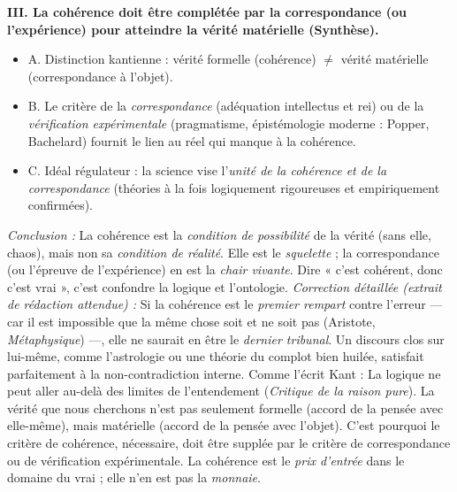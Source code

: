 \documentclass[11pt]{article}
\begin{document}
\begin{exoresolu}
\textbf{III. La cohérence doit être complétée par la correspondance (ou l'expérience) pour atteindre la vérité matérielle (Synthèse).}
\begin{itemize}
    \item A. Distinction kantienne : vérité formelle (cohérence) $\neq$ vérité matérielle (correspondance à l'objet).
    \item B. Le critère de la \emph{correspondance} (adéquation intellectus et rei) ou de la \emph{vérification expérimentale} (pragmatisme, épistémologie moderne : Popper, Bachelard) fournit le lien au réel qui manque à la cohérence.
    \item C. Idéal régulateur : la science vise l'\emph{unité de la cohérence et de la correspondance} (théories à la fois logiquement rigoureuses et empiriquement confirmées).
\end{itemize}

\emph{Conclusion :} La cohérence est la \emph{condition de possibilité} de la vérité (sans elle, chaos), mais non sa \emph{condition de réalité}. Elle est le \emph{squelette} ; la correspondance (ou l'épreuve de l'expérience) en est la \emph{chair vivante}. Dire « c'est cohérent, donc c'est vrai », c'est confondre la logique et l'ontologie.
\tcblower
\emph{Correction détaillée (extrait de rédaction attendue) :}
\guillemotleft [...] Si la cohérence est le \emph{premier rempart} contre l'erreur — car \guillemotleft il est impossible que la même chose soit et ne soit pas \guillemotright (Aristote, \emph{Métaphysique}) —, elle ne saurait en être le \emph{dernier tribunal}. Un discours clos sur lui-même, comme l'astrologie ou une théorie du complot bien huilée, satisfait parfaitement à la non-contradiction interne. Comme l'écrit Kant : \guillemotleft La logique ne peut aller au-delà des limites de l'entendement \guillemotright (\emph{Critique de la raison pure}). La vérité que nous cherchons n'est pas seulement formelle (accord de la pensée avec elle-même), mais matérielle (accord de la pensée avec l'objet). C'est pourquoi le critère de cohérence, nécessaire, doit être supplée par le critère de correspondance ou de vérification expérimentale. La cohérence est le \emph{prix d'entrée} dans le domaine du vrai ; elle n'en est pas la \emph{monnaie}. \guillemotright
\end{exoresolu}
\end{document}
